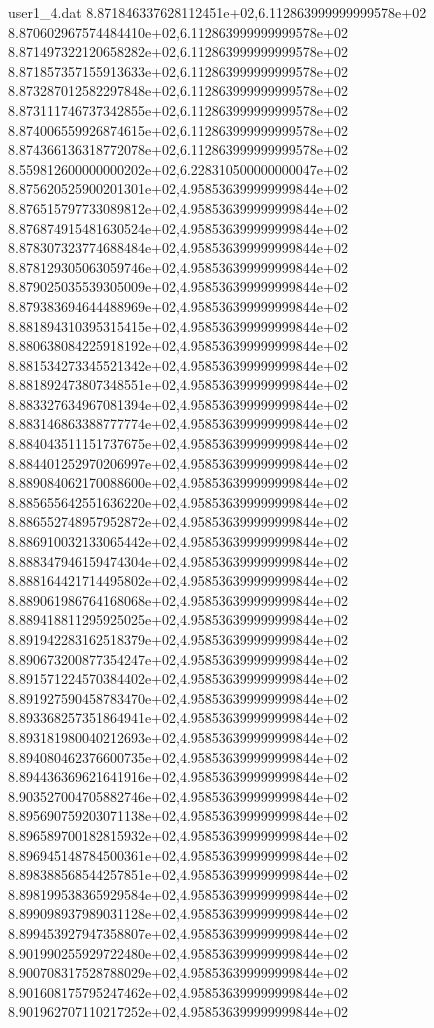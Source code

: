 \begin{filecontents}{user1_4.dat}
8.871846337628112451e+02,6.112863999999999578e+02
8.870602967574484410e+02,6.112863999999999578e+02
8.871497322120658282e+02,6.112863999999999578e+02
8.871857357155913633e+02,6.112863999999999578e+02
8.873287012582297848e+02,6.112863999999999578e+02
8.873111746737342855e+02,6.112863999999999578e+02
8.874006559926874615e+02,6.112863999999999578e+02
8.874366136318772078e+02,6.112863999999999578e+02
8.559812600000000202e+02,6.228310500000000047e+02
8.875620525900201301e+02,4.958536399999999844e+02
8.876515797733089812e+02,4.958536399999999844e+02
8.876874915481630524e+02,4.958536399999999844e+02
8.878307323774688484e+02,4.958536399999999844e+02
8.878129305063059746e+02,4.958536399999999844e+02
8.879025035539305009e+02,4.958536399999999844e+02
8.879383694644488969e+02,4.958536399999999844e+02
8.881894310395315415e+02,4.958536399999999844e+02
8.880638084225918192e+02,4.958536399999999844e+02
8.881534273345521342e+02,4.958536399999999844e+02
8.881892473807348551e+02,4.958536399999999844e+02
8.883327634967081394e+02,4.958536399999999844e+02
8.883146863388777774e+02,4.958536399999999844e+02
8.884043511151737675e+02,4.958536399999999844e+02
8.884401252970206997e+02,4.958536399999999844e+02
8.889084062170088600e+02,4.958536399999999844e+02
8.885655642551636220e+02,4.958536399999999844e+02
8.886552748957952872e+02,4.958536399999999844e+02
8.886910032133065442e+02,4.958536399999999844e+02
8.888347946159474304e+02,4.958536399999999844e+02
8.888164421714495802e+02,4.958536399999999844e+02
8.889061986764168068e+02,4.958536399999999844e+02
8.889418811295925025e+02,4.958536399999999844e+02
8.891942283162518379e+02,4.958536399999999844e+02
8.890673200877354247e+02,4.958536399999999844e+02
8.891571224570384402e+02,4.958536399999999844e+02
8.891927590458783470e+02,4.958536399999999844e+02
8.893368257351864941e+02,4.958536399999999844e+02
8.893181980040212693e+02,4.958536399999999844e+02
8.894080462376600735e+02,4.958536399999999844e+02
8.894436369621641916e+02,4.958536399999999844e+02
8.903527004705882746e+02,4.958536399999999844e+02
8.895690759203071138e+02,4.958536399999999844e+02
8.896589700182815932e+02,4.958536399999999844e+02
8.896945148784500361e+02,4.958536399999999844e+02
8.898388568544257851e+02,4.958536399999999844e+02
8.898199538365929584e+02,4.958536399999999844e+02
8.899098937989031128e+02,4.958536399999999844e+02
8.899453927947358807e+02,4.958536399999999844e+02
8.901990255929722480e+02,4.958536399999999844e+02
8.900708317528788029e+02,4.958536399999999844e+02
8.901608175795247462e+02,4.958536399999999844e+02
8.901962707110217252e+02,4.958536399999999844e+02

\end{filecontents}
